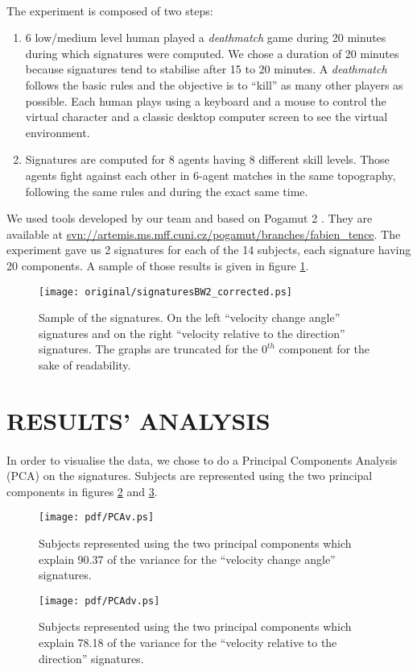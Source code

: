 \documentclass[a4paper,twocolumn]{article}
\begin{document}
\paragraph{}%
The experiment is composed of two steps:
\begin{enumerate}
 \item 6 low/medium level human played a \emph{deathmatch} game during 20 minutes during which signatures were computed. We chose a duration of 20 minutes because signatures tend to stabilise after 15 to 20 minutes. A \emph{deathmatch} follows the basic rules and the objective is to ``kill'' as many other players as possible. Each human plays using a keyboard and a mouse to control the virtual character and a classic desktop computer screen to see the virtual environment.
 \item Signatures are computed for 8 agents having 8 different skill levels. Those agents fight against each other in 6-agent matches in the same topography, following the same rules and during the exact same time.
\end{enumerate}
We used tools developed by our team and based on Pogamut 2 \cite{Burkert2007}. They are available at \url{svn://artemis.ms.mff.cuni.cz/pogamut/branches/fabien_tence}. The experiment gave us 2 signatures for each of the 14 subjects, each signature having 20 components. A sample of those results is given in figure \ref{signatures}.
\begin{figure}[!ht]
	\centering
	\texttt{[image: original/signaturesBW2\_corrected.ps]}
	\caption{Sample of the signatures. On the left ``velocity change angle'' signatures and on the right  ``velocity relative to the direction'' signatures. The graphs are truncated for the $0^{th}$ component for the sake of readability.}
	\label{signatures}
\end{figure}
\section{RESULTS' ANALYSIS}
\paragraph{}%
In order to visualise the data, we chose to do a Principal Components Analysis (PCA) on the signatures. Subjects are represented using the two principal components in figures \ref{PCAv} and \ref{PCAdv}.
\begin{figure}[!ht]
	\texttt{[image: pdf/PCAv.ps]}
	\caption{Subjects represented using the two principal components which explain 90.37 of the variance for the ``velocity change angle'' signatures.}
	\label{PCAv}
\end{figure}
\begin{figure}[!ht]
	\texttt{[image: pdf/PCAdv.ps]}
	\caption{Subjects represented using the two principal components which explain 78.18 of the variance for the ``velocity relative to the direction'' signatures.}
	\label{PCAdv}
\end{figure}
\end{document}
